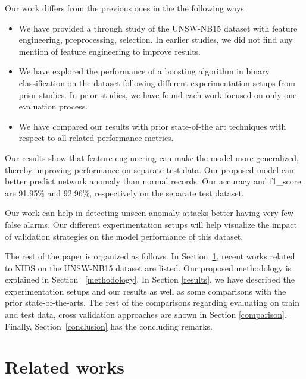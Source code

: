 \documentclass[14pt, conference]{IEEEtran}
\begin{document}
Our work differs from the previous ones in the the following ways.
\begin{itemize}
    \item We have provided a through study of the UNSW-NB15 dataset with feature engineering, preprocessing, selection. In earlier studies, we did not find any mention of feature engineering to improve results.
    \item We have explored the performance of a boosting algorithm in binary classification on the dataset following different experimentation setups from prior studies. In prior studies, we have found each work focused on only one evaluation process.
    \item We have compared our results with prior state-of-the art techniques  with respect to all related performance metrics.
\end{itemize}

Our results show that  feature engineering can make the model more generalized, thereby improving performance on separate test data.     Our proposed model can better predict network anomaly than normal records. Our accuracy and f1\_score are 91.95\% and 92.96\%, respectively on the separate test dataset.


Our work can help in detecting  unseen anomaly attacks better having very few false alarms.  Our different experimentation setups will help visualize the impact of validation strategies on the model performance of this dataset.


The rest of the paper is organized as follows. In Section~\ref{relatedWorks},  recent  works related to NIDS on the UNSW-NB15 dataset are listed. Our proposed methodology is explained in
Section ~\ref{methodology}. In Section \ref{results}, we have described the experimentation setups and our results as well as some comparisons with the prior state-of-the-arts.
The rest of the comparisons regarding evaluating on train and test data, cross validation approaches are shown in Section
\ref{comparison}. Finally, Section~\ref{conclusion} has the concluding remarks.




\section{Related works}
\label{relatedWorks}
\end{document}

